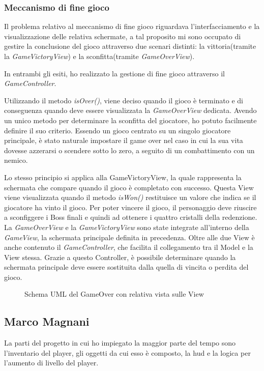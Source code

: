 \documentclass[a4paper,12pt]{report}
\begin{document}
\subsubsection{Meccanismo di fine gioco}
Il problema relativo al meccanismo di fine gioco riguardava l'interfacciamento e la  visualizzazione delle relativa schermate, a tal proposito mi sono occupato di gestire la conclusione del gioco attraverso due scenari distinti: la vittoria(tramite la \textit{GameVictoryView}) e la sconfitta(tramite \textit{GameOverView}).

In entrambi gli esiti, ho realizzato la gestione di fine gioco attraverso il \textit{GameController}. 

Utilizzando il metodo \textit{isOver()}, viene deciso quando il gioco è terminato e di conseguenza quando deve essere visualizzata la \textit{GameOverView} dedicata. Avendo un unico metodo per determinare la sconfitta del giocatore, ho potuto facilmente definire il suo criterio. Essendo un gioco centrato su un singolo giocatore principale, è stato naturale impostare il game over nel caso in cui la sua vita dovesse azzerarsi o scendere sotto lo zero, a seguito di un combattimento con un nemico. 

Lo stesso principio si applica alla GameVictoryView, la quale rappresenta la schermata che compare quando il gioco è completato con successo. Questa View viene visualizzata quando il metodo \textit{isWon()} restituisce un valore che indica se il giocatore ha vinto il gioco. Per poter vincere il gioco, il personaggio deve riuscire a sconfiggere i Boss finali e quindi ad ottenere i quattro cristalli della redenzione.\\

La \textit{GameOverView} e la \textit{GameVictoryView} sono state integrate all'interno della \textit{GameView}, la schermata principale definita in precedenza. Oltre alle due View è anche contenuto il \textit{GameController}, che facilita il collegamento tra il Model e la View stessa. Grazie a questo Controller, è possibile determinare quando la schermata principale deve essere sostituita dalla quella di vincita o perdita del gioco.

\begin{figure}[H]
	\centering
	
	\caption{Schema UML del GameOver con relativa vista sulle View}
	\label{fig:the-exiled-victory_gameover-uml}
\end{figure}

\subsection{Marco Magnani}
La parti del progetto in cui ho impiegato la maggior parte del tempo sono l'inventario del player, gli oggetti da cui esso è composto, la hud e la logica per l'aumento di livello del player.
\end{document}
